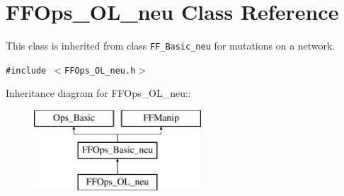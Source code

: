 \section{FFOps\_\-OL\_\-neu Class Reference}
\label{classFFOps__OL__neu}
This class is inherited from class {\tt FF\_\-Basic\_\-neu} for mutations on a network. 


{\tt \#include $<$FFOps\_\-OL\_\-neu.h$>$}

Inheritance diagram for FFOps\_\-OL\_\-neu::\begin{figure}[H]
\begin{center}
\leavevmode
\includegraphics[height=3cm]{classFFOps__OL__neu}
\end{center}
\end{figure}
